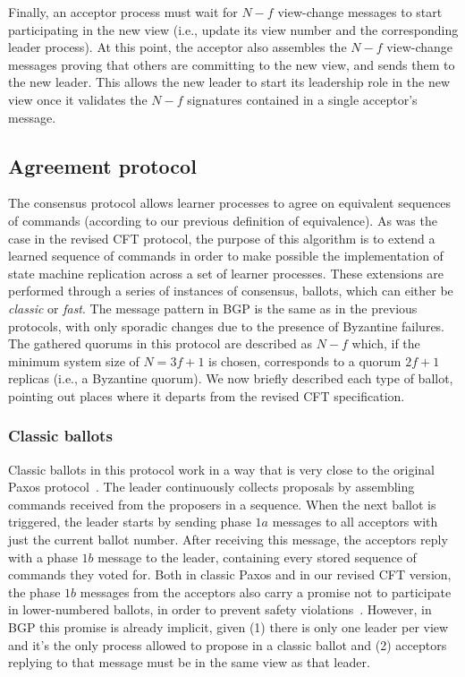 Finally, an acceptor process must wait for $N-f$ view-change messages to start participating in the new view (i.e., update its view number and the corresponding leader process). At this point, the acceptor also assembles the $N-f$ view-change messages proving that others are committing to the new view, and sends them to the new leader. This allows the new leader to start its leadership role in the new view once it validates the $N-f$ signatures contained in a single acceptor's message.

\subsection{Agreement protocol} 

The consensus protocol allows learner processes to agree on equivalent sequences of commands (according to our previous definition of equivalence).
As was the case in the revised CFT protocol, the purpose of this algorithm is to extend a learned sequence of commands in order to make possible the implementation of state machine replication across a set of learner processes. These extensions are performed through a series of instances of consensus, ballots, which can either be \textit{classic} or \textit{fast}. The message pattern in BGP is the same as in the previous protocols, with only sporadic changes due to the presence of Byzantine failures. The gathered quorums in this protocol are described as $N-f$ which, if the minimum system size of $N=3f+1$ is chosen, corresponds to a quorum $2f+1$ replicas (i.e., a Byzantine quorum).
We now briefly described each type of ballot, pointing out places where it departs from the revised CFT specification.

\subsubsection{Classic ballots} 

Classic ballots in this protocol work in a way that is very close to the original Paxos protocol~\cite{Lam98}. 
The leader continuously collects proposals by assembling commands received from the proposers in a sequence. 
When the next ballot is triggered, the leader starts by sending phase $1a$ messages to all acceptors with just the current ballot number. After receiving this message, the acceptors reply with a phase $1b$ message to the leader, containing every stored sequence of commands they voted for. Both in classic Paxos and in our revised CFT version, the phase $1b$ messages from the acceptors also carry a promise not to participate in lower-numbered ballots, in order to prevent safety violations~\cite{Lam98}.  However, in BGP this promise is already implicit, given (1) there is only one leader per view and it's the only process allowed to propose in a classic ballot and (2) acceptors replying to that message must be in the same view as that leader.\par

